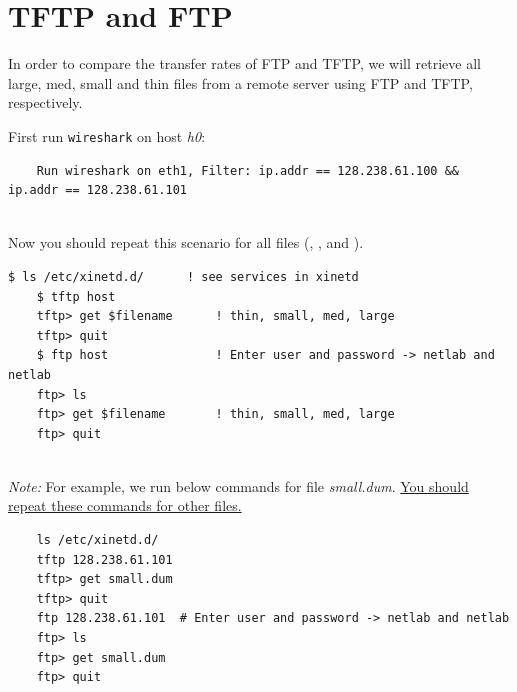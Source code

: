 \documentclass{UTNetLab}
\begin{document}
    \section{TFTP and FTP}
    In order to compare the transfer rates of FTP and TFTP, we will retrieve all large, med, small and thin files from a remote server using FTP and TFTP, respectively.

    First run  \lstinline{wireshark} on host \textit{h0}:
    
    \begin{lstlisting}
    Run wireshark on eth1, Filter: ip.addr == 128.238.61.100 && ip.addr == 128.238.61.101
       
    \end{lstlisting}

    
    
    Now you should repeat this scenario for all files (, ,  and ).
    
    \begin{lstlisting}[frame=trBL,language={cisco}]
    $ ls /etc/xinetd.d/		 ! see services in xinetd
    $ tftp host
    tftp> get $filename		 ! thin, small, med, large
    tftp> quit
    $ ftp host 				 ! Enter user and password -> netlab and netlab
    ftp> ls
    ftp> get $filename		 ! thin, small, med, large
    ftp> quit
    
    \end{lstlisting}
    
    \textit{Note: }For example, we run below commands for file \textit{small.dum}. \underline{You should repeat these commands for other files.}
    
    \begin{lstlisting}
    ls /etc/xinetd.d/
    tftp 128.238.61.101
    tftp> get small.dum
    tftp> quit
    ftp 128.238.61.101  # Enter user and password -> netlab and netlab
    ftp> ls
    ftp> get small.dum
    ftp> quit  
    \end{lstlisting}
   
\end{document}

